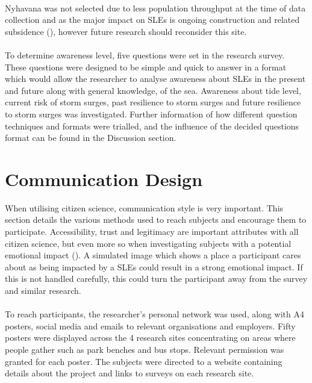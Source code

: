 \paragraph{}
Nyhavana was not selected due to less population throughput at the time of data collection and as the major impact on SLEs is ongoing construction and related subsidence (\cite{miljoenheten_og_byplankontoret_trondheim_kommune_9-notat-om-havnivastigning-og-stormflo---hensyn-i-arealplanlegging-nyhavnapdf_2020}), however future research should reconsider this site.  
\paragraph{}
To determine awareness level, five questions were set in the research survey. These questions were designed to be simple and quick to answer in a format which would allow the researcher to analyse awareness about SLEs in the present and future along with general knowledge, of the sea. Awareness about tide level, current risk of storm surges, past resilience to storm surges and future resilience to storm surges was investigated. Further information of how different question techniques and formats were trialled, and the influence of the decided questions format can be found in the Discussion section.



\section{Communication Design}

When utilising citizen science, communication style is very important. This section details the various methods used to reach subjects and encourage them to participate. Accessibility, trust and legitimacy are important attributes with all citizen science, but even more so when investigating subjects with a potential emotional impact (\cite{tweddle_guide_2012}). A simulated image which shows a place a participant cares about as being impacted by a SLEs could result in a strong emotional impact. If this is not handled carefully, this could turn the participant away from the survey and similar research.
\paragraph{}

To reach participants, the researcher's personal network was used, along with A4 posters, social media and emails to relevant organisations and employers. Fifty posters were displayed across the 4 research sites concentrating on areas where people gather such as park benches and bus stops. Relevant permission was granted for each poster. The subjects were directed to a website containing details about the project and links to surveys on each research site.
